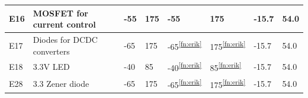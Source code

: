 \documentclass[a4paper,12pt,oneside]{article}
\begin{document}
\begin{longtable}{|m{1cm}|m{3.5cm}|m{1.3cm}|m{1.3cm}|m{1.4cm}|m{1.3cm}|m{1.3cm}|m{1.3cm}|}
E16 & MOSFET for current control & -55 & 175 & -55 & 175 & -15.7 & 54.0 \\ \hline
E17 & Diodes for DCDC converters & -65 & 175 & -65\textsuperscript{\ref{fn:erik}} & 175\textsuperscript{\ref{fn:erik}} & -15.7 & 54.0 \\ \hline
E18 & 3.3V LED & -40 & 85 & -40\textsuperscript{\ref{fn:erik}} & 85\textsuperscript{\ref{fn:erik}} & -15.7 & 54.0 \\ \hline 
E28 & 3.3 Zener diode & -65 & 175 & -65\textsuperscript{\ref{fn:erik}} & 175\textsuperscript{\ref{fn:erik}} & -15.7 & 54.0 \\ \hline

\end{longtable}
\end{document}
